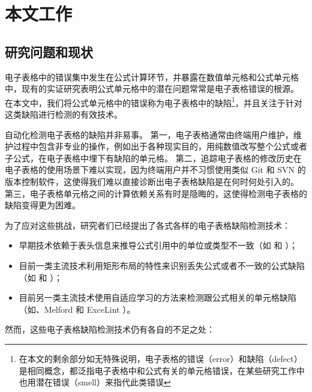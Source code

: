 \section{本文工作}
\subsection{研究问题和现状}
电子表格中的错误集中发生在公式计算环节，并暴露在数值单元格和公式单元格中，现有的实证研究\cite{panko2010revising}表明公式单元格中的潜在问题常常是电子表格错误的根源。
在本文中，我们将公式单元格中的错误称为电子表格中的缺陷\footnote{在本文的剩余部分如无特殊说明，电子表格的错误（error）和缺陷（defect）是相同概念，都泛指电子表格中和公式有关的单元格错误，在某些研究工作中也用潜在错误（smell）来指代此类错误}，并且关注于针对这类缺陷进行检测的有效技术。

自动化检测电子表格的缺陷并非易事。
第一，电子表格通常由终端用户维护，维护过程中包含非专业的操作，例如出于各种现实目的，用纯数值改写整个公式或者子公式，在电子表格中埋下有缺陷的单元格。
第二，追踪电子表格的修改历史在电子表格的使用场景下难以实现，因为终端用户并不习惯使用类似 Git 和 SVN 的版本控制软件，这使得我们难以直接诊断出电子表格缺陷是在何时何处引入的。
第三，电子表格单元格之间的计算依赖关系有时是隐晦的，这使得检测电子表格的缺陷变得更为困难。

为了应对这些挑战，研究者们已经提出了各式各样的电子表格缺陷检测技术：

\begin{itemize}
    \item 早期技术依赖于表头信息来推导公式引用中的单位或类型不一致（如\uc \cite{abraham2007ucheck} 和 \di \cite{chambers2009automatic}）；
    \item 目前一类主流技术利用矩形布局的特性来识别丢失公式或者不一致的公式缺陷（如\am \cite{dou2014spreadsheet} 和 \ca \cite{dou2017cacheck}）；
    \item 目前另一类主流技术使用自适应学习的方法来检测跟公式相关的单元格缺陷（如\cu \cite{cheung2016custodes}、Melford\cite{singh2017melford} 和 ExceLint \cite{Barowy2018excelint}）。
\end{itemize}

然而，这些电子表格缺陷检测技术仍有各自的不足之处：

